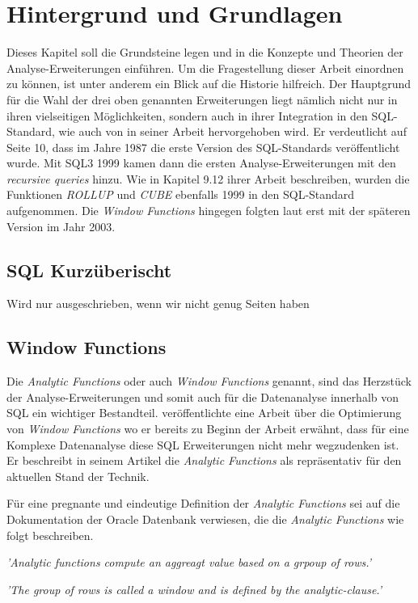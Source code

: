\chapter{Hintergrund und Grundlagen}
Dieses Kapitel soll die Grundsteine legen und in die Konzepte und Theorien der Analyse-Erweiterungen
einführen. Um die Fragestellung dieser Arbeit einordnen zu können, ist unter anderem
ein Blick auf die Historie hilfreich. Der Hauptgrund für die Wahl der drei oben
genannten Erweiterungen liegt nämlich nicht nur in ihren vielseitigen
Möglichkeiten, sondern auch in ihrer Integration in den SQL-Standard, wie auch
von \cite{grust2017advanced} in seiner Arbeit hervorgehoben wird. Er verdeutlicht
auf Seite 10, dass im Jahre 1987 die erste Version des SQL-Standards
veröffentlicht wurde. Mit SQL3 1999 kamen dann die ersten Analyse-Erweiterungen mit
den \textit{recursive queries} hinzu. Wie \cite{melton2001sql} in Kapitel 9.12 ihrer
Arbeit beschreiben, wurden die Funktionen \textit{ROLLUP} und \textit{CUBE}
ebenfalls 1999 in den SQL-Standard aufgenommen. Die \textit{Window Functions}
hingegen folgten laut \cite{grust2017advanced} erst mit der späteren Version im
Jahr 2003.

\section{SQL Kurzüberischt}
Wird nur ausgeschrieben, wenn wir nicht genug Seiten haben

\section{Window Functions}
Die \textit{Analytic Functions} oder auch \textit{Window Functions} genannt,
sind das Herzstück der Analyse-Erweiterungen und somit auch für die Datenanalyse
innerhalb von SQL ein wichtiger Bestandteil. \cite{cao2012optimization} veröffentlichte
eine Arbeit über die Optimierung von \textit{Window Functions} wo er bereits zu
Beginn der Arbeit erwähnt, dass für eine Komplexe Datenanalyse diese SQL Erweiterungen
nicht mehr wegzudenken ist. Er beschreibt in seinem Artikel die \textit{Analytic
Functions} als repräsentativ für den aktuellen Stand der Technik.

Für eine pregnante und eindeutige Definition der \textit{Analytic Functions} sei
auf die Dokumentation der Oracle Datenbank verwiesen, die die \textit{Analytic
Functions} wie folgt beschreiben.

\begin{center}
	\textit{ 'Analytic functions compute an aggreagt value based on a grpoup of
	rows.' } \\ \cite{oracle}

	\textit{ 'The group of rows is called a window and is defined by the analytic-clause.'
	} \\ \cite{oracle}
\end{center}

